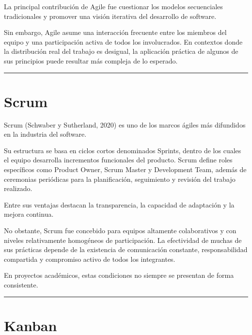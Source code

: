 \documentclass[14pt,a4paper,oneside]{extbook}
\begin{document}
La principal contribución de Agile fue cuestionar los modelos secuenciales tradicionales y promover una visión iterativa del desarrollo de software.

Sin embargo, Agile asume una interacción frecuente entre los miembros del equipo y una participación activa de todos los involucrados. En contextos donde la distribución real del trabajo es desigual, la aplicación práctica de algunos de sus principios puede resultar más compleja de lo esperado.

\par\vspace{1.5em}\noindent\hfill\rule{0.25\textwidth}{0.6pt}\hfill\par\vspace{1.5em}

\section{Scrum}

Scrum (Schwaber y Sutherland, 2020) es uno de los marcos ágiles más difundidos en la industria del software.

Su estructura se basa en ciclos cortos denominados Sprints, dentro de los cuales el equipo desarrolla incrementos funcionales del producto. Scrum define roles específicos como Product Owner, Scrum Master y Development Team, además de ceremonias periódicas para la planificación, seguimiento y revisión del trabajo realizado.

Entre sus ventajas destacan la transparencia, la capacidad de adaptación y la mejora continua.

No obstante, Scrum fue concebido para equipos altamente colaborativos y con niveles relativamente homogéneos de participación. La efectividad de muchas de sus prácticas depende de la existencia de comunicación constante, responsabilidad compartida y compromiso activo de todos los integrantes.

En proyectos académicos, estas condiciones no siempre se presentan de forma consistente.

\par\vspace{1.5em}\noindent\hfill\rule{0.25\textwidth}{0.6pt}\hfill\par\vspace{1.5em}

\section{Kanban}
\end{document}

